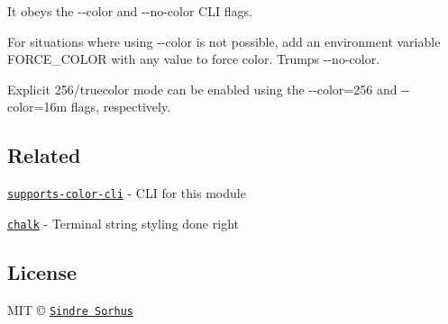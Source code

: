 It obeys the {\ttfamily -\/-\/color} and {\ttfamily -\/-\/no-\/color} C\+LI flags.

For situations where using {\ttfamily -\/-\/color} is not possible, add an environment variable {\ttfamily F\+O\+R\+C\+E\+\_\+\+C\+O\+L\+OR} with any value to force color. Trumps {\ttfamily -\/-\/no-\/color}.

Explicit 256/truecolor mode can be enabled using the {\ttfamily -\/-\/color=256} and {\ttfamily -\/-\/color=16m} flags, respectively.

\subsection*{Related}


\begin{DoxyItemize}
\item \href{https://github.com/chalk/supports-color-cli}{\tt supports-\/color-\/cli} -\/ C\+LI for this module
\item \href{https://github.com/chalk/chalk}{\tt chalk} -\/ Terminal string styling done right
\end{DoxyItemize}

\subsection*{License}

M\+IT © \href{http://sindresorhus.com}{\tt Sindre Sorhus} 
